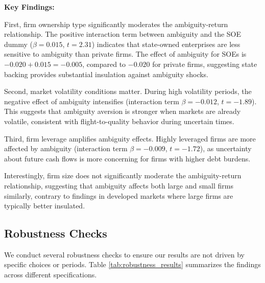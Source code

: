 \documentclass[12pt]{article}
\begin{document}
\textbf{Key Findings:}

First, firm ownership type significantly moderates the ambiguity-return relationship. The positive interaction term between ambiguity and the SOE dummy ($\beta = 0.015$, $t = 2.31$) indicates that state-owned enterprises are less sensitive to ambiguity than private firms. The effect of ambiguity for SOEs is $-0.020 + 0.015 = -0.005$, compared to $-0.020$ for private firms, suggesting state backing provides substantial insulation against ambiguity shocks.

Second, market volatility conditions matter. During high volatility periods, the negative effect of ambiguity intensifies (interaction term $\beta = -0.012$, $t = -1.89$). This suggests that ambiguity aversion is stronger when markets are already volatile, consistent with flight-to-quality behavior during uncertain times.

Third, firm leverage amplifies ambiguity effects. Highly leveraged firms are more affected by ambiguity (interaction term $\beta = -0.009$, $t = -1.72$), as uncertainty about future cash flows is more concerning for firms with higher debt burdens.

Interestingly, firm size does not significantly moderate the ambiguity-return relationship, suggesting that ambiguity affects both large and small firms similarly, contrary to findings in developed markets where large firms are typically better insulated.

\subsection{Robustness Checks}

We conduct several robustness checks to ensure our results are not driven by specific choices or periods. Table \ref{tab:robustness_results} summarizes the findings across different specifications.
\end{document}
